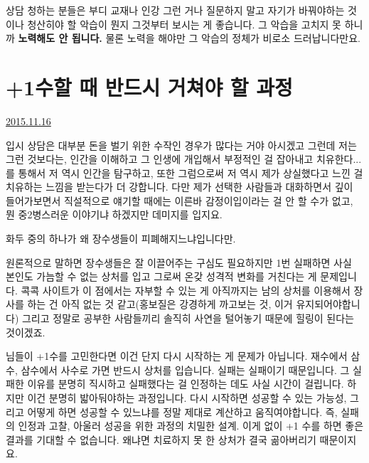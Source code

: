 상담 청하는 분들은 부디 교재나 인강 그런 거나 질문하지 말고
자기가 바꿔야하는 것이나 청산히야 할 악습이 뭔지 그것부터 보시는 게 좋습니다.
그 악습을 고치지 못 하니까 \textbf{노력해도 안 됩니다.}
물론 노력을 해야만 그 악습의 정체가 비로소 드러납니다만요.
\vspace{5mm}






\section{+1수할 때 반드시 거쳐야 할 과정}
\href{https://www.kockoc.com/Apoc/493832}{2015.11.16}

\vspace{5mm}

입시 상담은 대부분 돈을 벌기 위한 수작인 경우가 많다는 거야 아시겠고
그런데 저는 그런 것보다는, 인간을 이해하고 그 인생에 개입해서 부정적인 걸 잡아내고 치유한다... 를 통해서
저 역시 인간을 탐구하고, 또한 그럼으로써 저 역시 제가 상실했다고 느낀 걸 치유하는 느낌을 받는다가 더 강합니다.
다만 제가 선택한 사람들과 대화하면서 깊이 들어가보면서 직설적으로 얘기할 때에는
이른바 감정이입이라는 걸 안 할 수가 없고, 뭔 중2병스러운 이야기냐 하겠지만 데미지를 입지요.
\vspace{5mm}

화두 중의 하나가 왜 장수생들이 피폐해지느냐입니다만.
\vspace{5mm}

원론적으로 말하면 장수생들은 잘 이끌어주는 구심도 필요하지만
1번 실패하면 사실 본인도 가늠할 수 없는 상처를 입고 그로써 온갖 성격적 변화를 거친다는 게 문제입니다.
콕콕 사이트가 이 점에서는 자부할 수 있는 게
아직까지는 남의 상처를 이용해서 장사를 하는 건 아직 없는 것 같고(홍보질은 강경하게 까고보는 것, 이거 유지되어야합니다)
그리고 정말로 공부한 사람들끼리 솔직히 사연을 털어놓기 때문에 힐링이 된다는 것이겠죠.
\vspace{5mm}

님들이 +1수를 고민한다면 이건 단지 다시 시작하는 게 문제가 아닙니다.
재수에서 삼수, 삼수에서 사수로 가면 반드시 상처를 입습니다. 실패는 실패이기 때문입니다.
그 실패한 이유를 분명히 직시하고 실패했다는 걸 인정하는 데도 사실 시간이 걸립니다. 하지만 이건 분명히 밟아둬야하는 과정입니다.
다시 시작하면 성공할 수 있는 가능성, 그리고 어떻게 하면 성공할 수 있느냐를 정말 제대로 계산하고 움직여야합니다.
즉, 실패의 인정과 고찰, 아울러 성공을 위한 과정의 치밀한 설계.
이게 없이 +1 수를 하면 좋은 결과를 기대할 수 없습니다. 왜냐면 치료하지 못 한 상처가 결국 곪아버리기 때문이지요.
\vspace{5mm}


